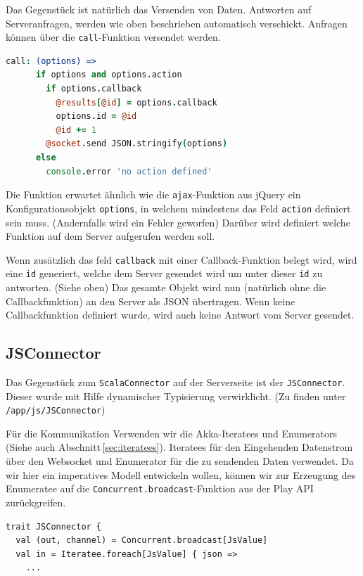 Das Gegenstück ist natürlich das Versenden von Daten. Antworten auf Serveranfragen, werden wie oben
beschrieben automatisch verschickt. Anfragen können über die \texttt{call}-Funktion versendet
werden.

\begin{lstlisting}[language=coffee] 
    call: (options) =>      
      if options and options.action        
        if options.callback
          @results[@id] = options.callback
          options.id = @id
          @id += 1
        @socket.send JSON.stringify(options)
      else
        console.error 'no action defined'
\end{lstlisting}

Die Funktion erwartet ähnlich wie die \texttt{ajax}-Funktion aus jQuery ein Konfigurationsobjekt
\texttt{options}, in welchem mindestens das Feld \texttt{action} definiert sein muss. (Andernfalls
wird ein Fehler geworfen) Darüber wird definiert welche Funktion auf dem Server aufgerufen werden
soll.

Wenn zusätzlich das feld \texttt{callback} mit einer Callback-Funktion belegt wird, wird eine
\texttt{id} generiert, welche dem Server gesendet wird um unter dieser \texttt{id} zu antworten.
(Siehe oben) Das gesamte Objekt wird nun (natürlich ohne die Callbackfunktion) an den Server als
JSON übertragen. Wenn keine Callbackfunktion definiert wurde, wird auch keine Antwort vom Server
gesendet.

\subsection{JSConnector}

Das Gegenstück zum \texttt{ScalaConnector} auf der Serverseite ist der \texttt{JSConnector}. Dieser
wurde mit Hilfe dynamischer Typisierung verwirklicht. (Zu finden unter \texttt{/app/js/JSConnector})

Für die Kommunikation Verwenden wir die Akka-Iteratees und Enumerators (Siehe auch
Abschnitt\,\ref{sec:iteratees}). Iteratees für den Eingehenden Datenstrom über den Websocket und
Enumerator für die zu sendenden Daten verwendet. Da wir hier ein imperatives Modell entwickeln
wollen, können wir zur Erzeugung des Enumeratee auf die \texttt{Concurrent.broadcast}-Funktion aus
der Play API zurückgreifen.

\begin{lstlisting}
trait JSConnector {
  val (out, channel) = Concurrent.broadcast[JsValue]
  val in = Iteratee.foreach[JsValue] { json =>
    ...
\end{lstlisting}

